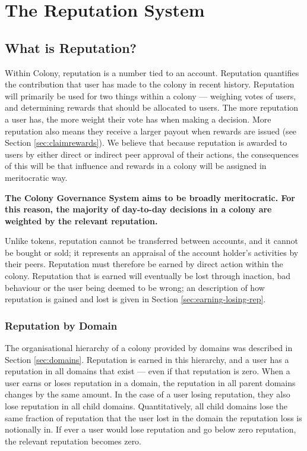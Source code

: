 \section{The Reputation System}\label{sec:reputation}
\subsection{What is Reputation?}\label{subsec:what-is-reputation}

Within Colony, reputation is a number tied to an account. Reputation quantifies the contribution that user has made to the colony in recent history. Reputation will primarily be used for two things within a colony --- weighing votes of users, and determining rewards that should be allocated to users. The more reputation a user has, the more weight their vote has when making a decision. More reputation also means they receive a larger payout when rewards are issued (see Section \ref{sec:claimrewards}). We believe that because reputation is awarded to users by either direct or indirect peer approval of their actions, the consequences of this will be that influence and rewards in a colony will be assigned in meritocratic way.

\textbf{The Colony Governance System aims to be broadly meritocratic. For this reason, the majority of day-to-day decisions in a colony are weighted by the relevant reputation.}

Unlike tokens, reputation cannot be transferred between accounts, and it cannot be bought or sold; it represents an appraisal of the account holder's activities by their peers. Reputation must therefore be earned by direct action within the colony. Reputation that is earned will eventually be lost through inaction, bad behaviour or the user being deemed to be wrong; an description of how reputation is gained and lost is given in Section \ref{sec:earning-losing-rep}.

\subsubsection{Reputation by Domain}\label{sec:rep-by-domain}
The organisational hierarchy of a colony provided by domains was described in Section \ref{sec:domains}. Reputation is earned in this hierarchy, and a user has a reputation in all domains that exist --- even if that reputation is zero. When a user earns or loses reputation in a domain, the reputation in all parent domains changes by the same amount. In the case of a user losing reputation, they also lose reputation in all child domains. Quantitatively, all child domains lose the same fraction of reputation that the user lost in the domain the reputation loss is notionally in. If ever a user would lose reputation and go below zero reputation, the relevant reputation becomes zero.

